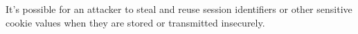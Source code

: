 It's possible for an attacker to steal and reuse
session identifiers or other sensitive cookie values
when they are stored or transmitted insecurely\cite{OWASP}.


